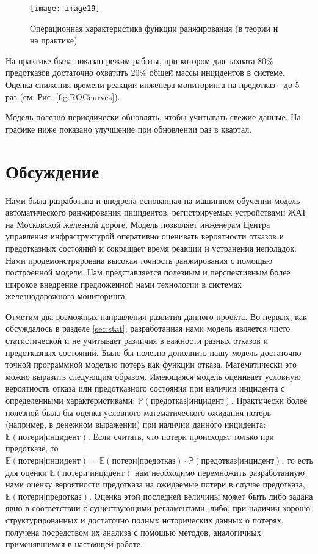 \begin{figure}
\centering
\texttt{[image: image19]}
\caption{Операционная характеристика функции ранжирования (в теории и на практике)}
\centering
\label{fig:image19}
\end{figure}

На практике была показан режим работы, при котором для захвата 80\% предотказов достаточно охватить 20\% общей массы инцидентов в системе. Оценка снижения времени реакции инженера мониторинга на предотказ - до 5 раз (см. Рис. \ref{fig:ROCcurves}).

Модель полезно периодически обновлять, чтобы учитывать свежие данные. На графике ниже показано улучшение при обновлении раз в квартал.



\section{Обсуждение}
Нами была разработана и внедрена основанная на машинном обучении модель автоматического ранжирования инцидентов, регистрируемых устройствами ЖАТ на Московской железной дороге. Модель позволяет инженерам Центра управления инфраструктурой оперативно оценивать вероятности отказов и предотказных состояний и сокращает время реакции и устранения неполадок. Нами продемонстрирована высокая точность ранжирования с помощью построенной модели. Нам представляется полезным и перспективным более широкое внедрение предложенной нами технологии в системах железнодорожного мониторинга.  

Отметим два возможных направления развития данного проекта. Во-первых, как обсуждалось в разделе \ref{sec:stat}, разработанная нами модель является чисто статистической и не учитывает различия в важности разных отказов и предотказных состояний. Было бы полезно дополнить нашу модель достаточно точной программной моделью потерь как функции отказа. Математически это можно выразить следующим образом. Имеющаяся модель оценивает условную вероятность отказа или предотказного состояния при наличии инцидента с определенными характеристиками: $\mathbb P(\text{предотказ}|\text{инцидент})$. Практически более полезной была бы оценка условного математического ожидания потерь (например, в денежном выражении) при наличии данного инцидента: $\mathbb E(\text{потери}|\text{инцидент})$. Если считать, что потери происходят только при предотказе, то $\mathbb E(\text{потери}|\text{инцидент})=\mathbb E(\text{потери}|\text{предотказ})\cdot\mathbb P(\text{предотказ}|\text{инцидент})$, то есть для оценки $\mathbb E(\text{потери}|\text{инцидент})$ нам необходимо перемножить разработанную нами оценку вероятности предотказа на ожидаемые потери в случае предотказа, $\mathbb E(\text{потери}|\text{предотказ})$. Оценка этой последней величины может быть либо задана явно в соответствии с существующими регламентами, либо, при наличии хорошо структурированных и достаточно полных исторических данных о потерях, получена посредством их анализа с помощью методов, аналогичных применявшимся в настоящей работе.

